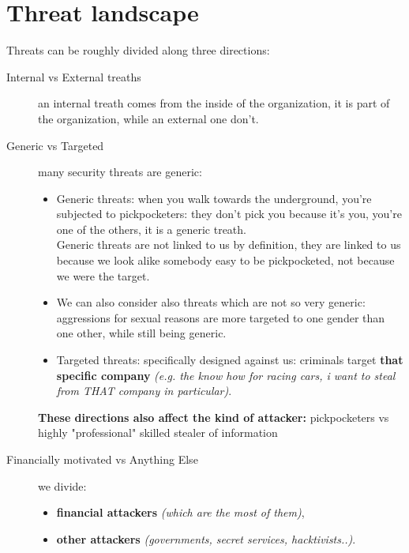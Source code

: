     \section{Threat landscape}
        Threats can be roughly divided along three directions:
        \begin{description}
            \item[Internal vs External treaths] an internal treath comes from the inside of the organization, it is part of the organization, while an external one don't.
            \item[Generic vs Targeted] many security threats are generic:
                \begin{itemize}
                    \item Generic threats: when you walk towards the underground, you're subjected to pickpocketers: they don't pick you because it's you, you're one of the others, it is a generic treath.
                    \\Generic threats are not linked to us by definition, they are linked to us because we look alike somebody easy to be pickpocketed, not because we were the target.
                    \item We can also consider also threats which are not so very generic: aggressions for sexual reasons are more targeted to one gender than one other, while still being generic.
                    \item Targeted threats: specifically designed against us: criminals target \textbf{that specific company} \textit{(e.g. the know how for racing cars, i want to steal from THAT company in particular)}.
                \end{itemize}          
                \textbf{These directions also affect the kind of attacker:} pickpocketers vs highly "professional" skilled stealer of information                                                                                                                                                                                                                                        
                \item[Financially motivated vs Anything Else] we divide:
                \begin{itemize}
                    \item \textbf{financial attackers} \textit{(which are the most of them)},
                    \item \textbf{other attackers} \textit{(governments, secret services, hacktivists..)}.

\end{itemize}
\end{description}
